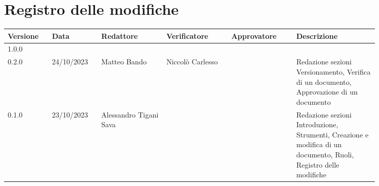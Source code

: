 \section*{Registro delle modifiche}
{
\renewcommand{\arraystretch}{1.5}
\scriptsize
\begin{tabular}{p{0.10\linewidth}p{0.10\linewidth}p{0.15\linewidth}p{0.15\linewidth}p{0.15\linewidth}p{0.19\linewidth}}
    \textbf{Versione}   & \textbf{Data} & \textbf{Redattore}        & \textbf{Verificatore} & \textbf{Approvatore}  & \textbf{Descrizione}  \\
    \hline
    1.0.0 \\
    \hline
    0.2.0               & 24/10/2023    & Matteo Bando              & Niccolò Carlesso      &                       & Redazione sezioni Versionamento, Verifica di un documento, Approvazione di un documento   \\
    \hline
    0.1.0               & 23/10/2023    & Alessandro Tigani Sava    &                       &                       & Redazione sezioni Introduzione, Strumenti, Creazione e modifica di un documento, Ruoli, Registro delle modifiche \\
    \hline
\end{tabular}
}